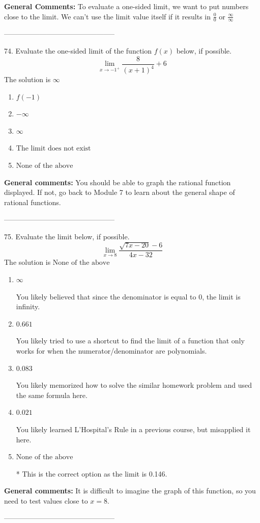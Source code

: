 \documentclass{extbook}[14pt]
\begin{document}
\textbf{General Comments:} To evaluate a one-sided limit, we want to put numbers close to the limit. We can't use the limit value itself if it results in $\frac{0}{0}$ or $\frac{\infty}{\infty}$

-----------------------------------------------

74. Evaluate the one-sided limit of the function $f(x)$ below, if possible.
\[ \lim_{x \rightarrow -1^+} \frac{8}{(x+1)^4}+6 \] 
The solution is $ \infty $ 

\begin{enumerate}[label=\Alph*.] 
\item $ f(-1) $ 

  
\item $ -\infty $ 

  
\item $ \infty $ 

  
\item $ \text{The limit does not exist} $ 

  
\item $ \text{None of the above} $ 

  
\end{enumerate} 
 
\textbf{General comments:} You should be able to graph the rational function displayed. If not, go back to Module 7 to learn about the general shape of rational functions.

-----------------------------------------------

75. Evaluate the limit below, if possible.
\[ \lim_{x \rightarrow 8} \frac{\sqrt{7x - 20} - 6}{4x - 32} \] 
The solution is $ \text{None of the above} $ 

\begin{enumerate}[label=\Alph*.] 
\item $ \infty $ 

 You likely believed that since the denominator is equal to 0, the limit is infinity. 
\item $ 0.661 $ 

 You likely tried to use a shortcut to find the limit of a function that only works for when the numerator/denominator are polynomials. 
\item $ 0.083 $ 

 You likely memorized how to solve the similar homework problem and used the same formula here. 
\item $ 0.021 $ 

 You likely learned L'Hospital's Rule in a previous course, but misapplied it here. 
\item $ \text{None of the above} $ 

 * This is the correct option as the limit is 0.146. 
\end{enumerate} 
 
\textbf{General comments:} It is difficult to imagine the graph of this function, so you need to test values close to $x = 8$.

-----------------------------------------------
\end{document}
